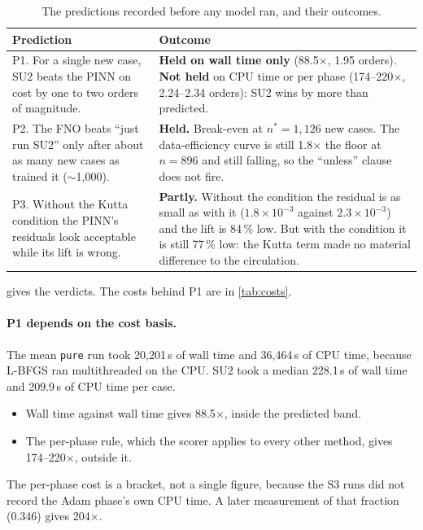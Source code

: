 \documentclass[11pt]{article}
\begin{document}
\begin{table}[t]
\centering\small
\caption{The predictions recorded before any model ran, and their outcomes.}
\label{tab:predictions}
\begin{tabularx}{\textwidth}{@{}>{\raggedright\arraybackslash}p{}>{\raggedright\arraybackslash}X@{}}
\toprule
Prediction & Outcome\\
\midrule
P1. For a single new case, SU2 beats the PINN on cost by one to two orders of magnitude. &
\textbf{Held on wall time only} (88.5$\times$, 1.95 orders). \textbf{Not held} on CPU time or
per phase (174--220$\times$, 2.24--2.34 orders): SU2 wins by more than predicted.\\
\addlinespace
P2. The FNO beats ``just run SU2'' only after about as many new cases as trained it ($\sim$1,000). &
\textbf{Held.} Break-even at $n^\ast = 1{,}126$ new cases. The data-efficiency curve is still
1.8$\times$ the floor at $n = 896$ and still falling, so the ``unless'' clause does not fire.\\
\addlinespace
P3. Without the Kutta condition the PINN's residuals look acceptable while its lift is wrong. &
\textbf{Partly.} Without the condition the residual is as small as with it ($1.8\times10^{-3}$
against $2.3\times10^{-3}$) and the lift is 84\,\% low. But with the condition it is still 77\,\%
low: the Kutta term made no material difference to the circulation.\\
\bottomrule
\end{tabularx}
\end{table}

 gives the verdicts. The costs behind P1 are in \cref{tab:costs}.

\paragraph{P1 depends on the cost basis.}
The mean \texttt{pure} run took 20,201\,s of wall time and 36,464\,s of CPU time, because L-BFGS
ran multithreaded on the CPU. SU2 took a median 228.1\,s of wall time and 209.9\,s of CPU time per
case.
\begin{itemize}
  \item Wall time against wall time gives 88.5$\times$, inside the predicted band.
  \item The per-phase rule, which the scorer applies to every other method, gives 174--220$\times$,
    outside it.
\end{itemize}
The per-phase cost is a bracket, not a single figure, because the S3 runs did not record the Adam
phase's own CPU time. A later measurement of that fraction (0.346) gives 204$\times$.
\end{document}

